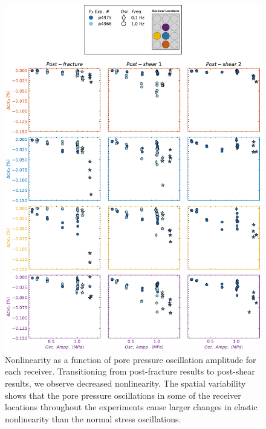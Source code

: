 \documentclass[letterpaper,10pt]{article}
\begin{document}
	\begin{figure}[ht]
		\centering
		\includegraphics[width=0.9\columnwidth]{Delc_bypair_all_PP}
		\caption{Nonlinearity as a function of pore pressure oscillation amplitude for each receiver. Transitioning from post-fracture results to post-shear results, we observe decreased nonlinearity. The spatial variability shows that the pore pressure oscillations in some of the receiver locations throughout the experiments cause larger changes in elastic nonlinearity than the normal stress oscillations.}
		\label{fig:delc_plots_pp}
	\end{figure}
	
	\clearpage
	
\end{document}
